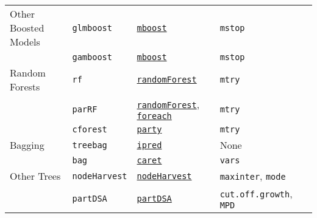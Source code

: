 \documentclass[12pt]{article}
\begin{document}
\begin{landscape}
\begin{longtable}{lllll}
      Other Boosted Models &
         \texttt{glmboost} & 
            {\tt \href{http://cran.r-project.org/web/packages/mboost/index.html}{mboost}}       &          
            \texttt{mstop} & \\   
         &      
         \texttt{gamboost} & 
            {\tt \href{http://cran.r-project.org/web/packages/mboost/index.html}{mboost}}       &          
            \texttt{mstop} & \\      

\rowcolor[rgb]{.95, .95, .95}                                        
      Random Forests & 
         \texttt{rf} & 
            {\tt \href{http://cran.r-project.org/web/packages/randomForest/index.html}{randomForest}}        & 
            \texttt{mtry}  & \\
\rowcolor[rgb]{.95, .95, .95}         
          & 
         \texttt{parRF} & 
             {\tt \href{http://cran.r-project.org/web/packages/randomForest/index.html}{randomForest}},  {\tt \href{http://cran.r-project.org/web/packages/foreach/index.html}{foreach}}        & 
            \texttt{mtry} & \\              

\rowcolor[rgb]{.95, .95, .95}         
                   & 
         \texttt{cforest} & 
            {\tt \href{http://cran.r-project.org/web/packages/party/index.html}{party}}     & 
            \texttt{mtry} & \\     
                        
      Bagging&
         \texttt{treebag} & 
             {\tt \href{http://cran.r-project.org/web/packages/ipred/index.html}{ipred}}       & 
            None & \\                 
            
          &
         \texttt{bag} & 
             {\tt \href{http://cran.r-project.org/web/packages/caret/index.html}{caret}}       & 
            \texttt{vars} & \\               

\rowcolor[rgb]{.95, .95, .95}            
            Other Trees &
            \texttt{nodeHarvest} & 
             {\tt \href{http://cran.r-project.org/web/packages/nodeHarvest/index.html}{nodeHarvest}}       & 
            \texttt{maxinter}, \texttt{mode}  & \\    

\rowcolor[rgb]{.95, .95, .95}         
            &
            \texttt{partDSA} & 
             {\tt \href{http://cran.r-project.org/web/packages/partDSA/index.html}{partDSA}}       & 
            \texttt{cut.off.growth}, \texttt{MPD}  & \\     
            

\end{longtable}
\end{landscape}
\end{document}
